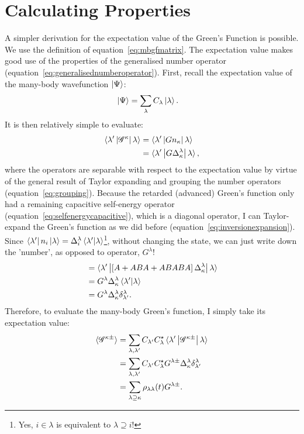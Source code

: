 \section{Calculating Properties}
\label{sec:calcprop}
A simpler derivation for the expectation value of the Green's Function is possible. We use the definition of equation~\ref{eq:mbgfmatrix}. The expectation value makes good use of the properties of the generalised number operator (equation~\ref{eq:generalisednumberoperator}). First, recall the expectation value of the many-body wavefunction $\ket{\Psi}$:
\begin{align*}
\ket{\Psi} &= \sum_\lambda C_\lambda \ket{\lambda}.
\end{align*}
It is then relatively simple to evaluate:
\begin{align*}
\braket{\lambda^\prime \left| \mathscr{G}^\kappa \right| \lambda } &= 
\braket{\lambda^\prime \left|  G n_\kappa \right| \lambda } \\
&= \braket{\lambda^\prime \left| G \Delta^\lambda_\kappa \right| \lambda },
\end{align*} where the operators are separable with respect to the expectation value by virtue of the general result of Taylor expanding and grouping the number operators (equation~\ref{eq:grouping}).
Because the retarded (advanced) Green's function only had a remaining capacitive self-energy operator (equation~\ref{eq:selfenergycapacitive}), which is a diagonal operator, I can Taylor-expand the Green's function as we did before (equation~\ref{eq:inversionexpansion}). Since $\bra{\lambda'}n_i \ket{\lambda}=\Delta^\lambda_i\braket{\lambda'|\lambda}$\footnote{Yes, $i \in \lambda$ is equivalent to $\lambda\supseteq i$!}, without changing the state, we can just write down the 'number', as opposed to operator,  $G^\lambda$! 
\begin{align*}
&= \braket{\lambda^\prime \left| \left[ A + ABA + ABABA \right] \Delta^\lambda_\kappa \right| \lambda } \\
&=  G^\lambda \Delta^\lambda_\kappa \braket{\lambda^\prime | \lambda }\\
&=  G^\lambda \Delta^\lambda_\kappa \delta^\lambda_{\lambda^\prime}.
\end{align*}
Therefore, to evaluate the many-body Green's function, I simply take its expectation value:
\begin{align*}
\braket{ \mathscr{G}^{\kappa\pm}} &= \sum_{\lambda,\lambda^\prime}C_{\lambda^\prime}C_\lambda^\star \braket{\lambda^\prime \left| \mathscr{G}^{\kappa\pm} \right| \lambda } \\
&= \sum_{\lambda,\lambda^\prime} C_{\lambda^\prime}C_\lambda^\star  G^{\lambda\pm} \Delta^\lambda_\kappa \delta^\lambda_{\lambda^\prime}\\
&= \sum_{\lambda \supseteq \kappa} \rho_{\lambda\lambda}(t) G^{\lambda\pm} .
\end{align*}
